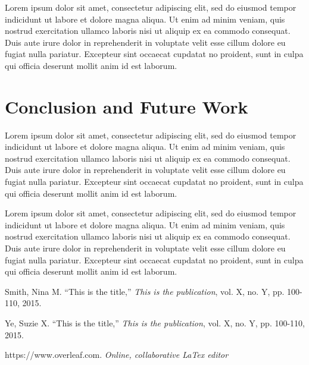 \documentclass[10pt, twocolumn]{article}
\begin{document}
Lorem ipsum dolor sit amet, consectetur adipiscing elit, sed do eiusmod tempor indicidunt ut labore et dolore magna aliqua. Ut enim ad minim veniam, quis nostrud exercitation ullamco laboris nisi ut aliquip ex ea commodo consequat. Duis aute irure dolor in reprehenderit in voluptate velit esse cillum dolore eu fugiat nulla pariatur. Excepteur sint occaecat cupdatat no proident, sunt in culpa qui officia deserunt mollit anim id est laborum.

\section{Conclusion and Future Work}

Lorem ipsum dolor sit amet, consectetur adipiscing elit, sed do eiusmod tempor indicidunt ut labore et dolore magna aliqua. Ut enim ad minim veniam, quis nostrud exercitation ullamco laboris nisi ut aliquip ex ea commodo consequat. Duis aute irure dolor in reprehenderit in voluptate velit esse cillum dolore eu fugiat nulla pariatur. Excepteur sint occaecat cupdatat no proident, sunt in culpa qui officia deserunt mollit anim id est laborum.

Lorem ipsum dolor sit amet, consectetur adipiscing elit, sed do eiusmod tempor indicidunt ut labore et dolore magna aliqua. Ut enim ad minim veniam, quis nostrud exercitation ullamco laboris nisi ut aliquip ex ea commodo consequat. Duis aute irure dolor in reprehenderit in voluptate velit esse cillum dolore eu fugiat nulla pariatur. Excepteur sint occaecat cupdatat no proident, sunt in culpa qui officia deserunt mollit anim id est laborum.

\begin{thebibliography}{10}

 Smith, Nina M. ``This is the title,'' {\em This is the publication}, vol. X, no. Y, pp. 100-110, 2015.

 Ye, Suzie X. ``This is the title,'' {\em This is the publication}, vol. X, no. Y, pp. 100-110, 2015.

 https://www.overleaf.com. {\em Online, collaborative LaTex editor}

\end{thebibliography}
\end{document}
